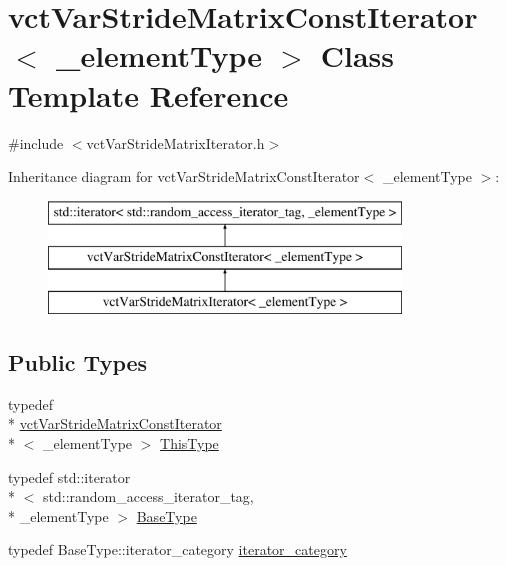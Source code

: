 \hypertarget{classvct_var_stride_matrix_const_iterator}{\section{vct\-Var\-Stride\-Matrix\-Const\-Iterator$<$ \-\_\-element\-Type $>$ Class Template Reference}
\label{classvct_var_stride_matrix_const_iterator}
}


{\ttfamily \#include $<$vct\-Var\-Stride\-Matrix\-Iterator.\-h$>$}

Inheritance diagram for vct\-Var\-Stride\-Matrix\-Const\-Iterator$<$ \-\_\-element\-Type $>$\-:\begin{figure}[H]
\begin{center}
\leavevmode
\includegraphics[height=3.000000cm]{d8/d1c/classvct_var_stride_matrix_const_iterator}
\end{center}
\end{figure}
\subsection*{Public Types}
\begin{DoxyCompactItemize}
\item 
typedef \\*
\hyperlink{classvct_var_stride_matrix_const_iterator}{vct\-Var\-Stride\-Matrix\-Const\-Iterator}\\*
$<$ \-\_\-element\-Type $>$ \hyperlink{classvct_var_stride_matrix_const_iterator_af68182ea2024c532e999fd1333cb0c6e}{This\-Type}
\item 
typedef std\-::iterator\\*
$<$ std\-::random\-\_\-access\-\_\-iterator\-\_\-tag, \\*
\-\_\-element\-Type $>$ \hyperlink{classvct_var_stride_matrix_const_iterator_af92f59f70debf8b2ac92e032621a9b1e}{Base\-Type}
\item 
typedef Base\-Type\-::iterator\-\_\-category \hyperlink{classvct_var_stride_matrix_const_iterator_a1620d069cfd9a2016c871fa2b5fde20a}{iterator\-\_\-category}
\end{DoxyCompactItemize}
